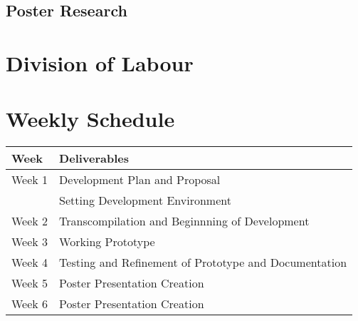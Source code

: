 \documentclass{article}
\begin{document}
\subsection{Poster Research} %

\section{Division of Labour} %

\section{Weekly Schedule} %

\begin{tabular}{ l | l }
  \textbf{Week} & \textbf{Deliverables} \\
  \hline
  \hline
  Week 1 & Development Plan and Proposal\\
         & Setting Development Environment\\ 
  Week 2 & Transcompilation and Beginnning of Development\\
  Week 3 & Working Prototype\\
  Week 4 & Testing and Refinement of Prototype and Documentation\\
  Week 5 & Poster Presentation Creation\\
  Week 6 & Poster Presentation Creation\\
\end{tabular}

\end{document}
